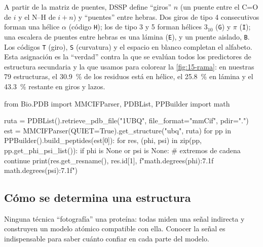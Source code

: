 \begin{simbolos}
\end{simbolos}

A partir de la matriz de puentes, DSSP define ``giros'' $n$ (un puente entre el C=O de $i$ y el N--H de $i+n$) y ``puentes'' entre hebras. Dos giros de tipo 4 consecutivos forman una hélice $\alpha$ (código \texttt{H}); los de tipo 3 y 5 forman hélices $3_{10}$ (\texttt{G}) y $\pi$ (\texttt{I}); una escalera de puentes entre hebras es una lámina (\texttt{E}), y un puente aislado, \texttt{B}. Los códigos \texttt{T} (giro), \texttt{S} (curvatura) y el espacio en blanco completan el alfabeto. Esta asignación es la ``verdad'' contra la que se evalúan todos los predictores de estructura secundaria y la que usamos para colorear la \cref{fig:15-rama}: en nuestras 79 estructuras, el \SI{30,9}{\percent} de los residuos está en hélice, el \SI{25,8}{\percent} en lámina y el \SI{43,3}{\percent} restante en giros y lazos.

\begin{codigo}
from Bio.PDB import MMCIFParser, PDBList, PPBuilder
import math

ruta = PDBList().retrieve_pdb_file("1UBQ", file_format="mmCif",
                                   pdir=".")
est = MMCIFParser(QUIET=True).get_structure("ubq", ruta)
for pp in PPBuilder().build_peptides(est[0]):
    for res, (phi, psi) in zip(pp, pp.get_phi_psi_list()):
        if phi is None or psi is None:        # extremos de cadena
            continue
        print(res.get_resname(), res.id[1],
              f"{math.degrees(phi):7.1f} {math.degrees(psi):7.1f}")
\end{codigo}

\subsection{Cómo se determina una estructura}

Ninguna técnica ``fotografía'' una proteína: todas miden una señal indirecta y construyen un modelo atómico compatible con ella. Conocer la señal es indispensable para saber cuánto confiar en cada parte del modelo.

